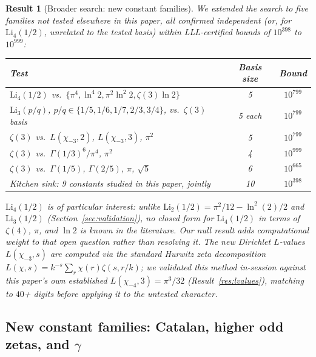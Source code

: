 \documentclass[12pt]{article}
\newtheorem{result}[theorem]{Result}
\theoremstyle{definition}
\theoremstyle{remark}
\begin{document}
\begin{result}[Broader search: new constant families]\label{res:extended-new}
We extended the search to five families not tested elsewhere in this
paper, all confirmed independent (or, for $\mathrm{Li}_4(1/2)$,
unrelated to the tested basis) within LLL-certified bounds of
$10^{398}$ to $10^{999}$:
\begin{center}
\begin{tabular}{@{}lcc@{}}
\toprule
Test & Basis size & Bound \\
\midrule
$\mathrm{Li}_4(1/2)$ vs.\ $\{\pi^4,\ln^4 2,\pi^2\ln^2 2,\zeta(3)\ln 2\}$ & 5 & $10^{799}$ \\
$\mathrm{Li}_3(p/q)$, $p/q\in\{1/5,1/6,1/7,2/3,3/4\}$, vs.\ $\zeta(3)$ basis & 5 each & $10^{799}$ \\
$\zeta(3)$ vs.\ $L(\chi_{-3},2)$, $L(\chi_{-3},3)$, $\pi^2$ & 5 & $10^{799}$ \\
$\zeta(3)$ vs.\ $\Gamma(1/3)^6/\pi^4$, $\pi^2$ & 4 & $10^{999}$ \\
$\zeta(3)$ vs.\ $\Gamma(1/5)$, $\Gamma(2/5)$, $\pi$, $\sqrt5$ & 6 & $10^{665}$ \\
Kitchen sink: 9 constants studied in this paper, jointly & 10 & $10^{398}$ \\
\bottomrule
\end{tabular}
\end{center}
$\mathrm{Li}_4(1/2)$ is of particular interest: unlike
$\mathrm{Li}_2(1/2)=\pi^2/12-\ln^2(2)/2$ and $\mathrm{Li}_3(1/2)$
(Section~\ref{sec:validation}), no closed form for
$\mathrm{Li}_4(1/2)$ in terms of $\zeta(4)$, $\pi$, and $\ln 2$ is
known in the literature.  Our null result adds computational weight
to that open question rather than resolving it.  The new Dirichlet
$L$-values $L(\chi_{-3},s)$ are computed via the standard Hurwitz zeta
decomposition $L(\chi,s)=k^{-s}\sum_r \chi(r)\zeta(s,r/k)$; we
validated this method in-session against this paper's own established
$L(\chi_{-4},3)=\pi^3/32$ (Result~\ref{res:lvalues}), matching to
$40$+ digits before applying it to the untested character.
\end{result}

\subsection{New constant families: Catalan, higher odd zetas, and
$\gamma$}\label{sec:new-constants}
\end{document}
